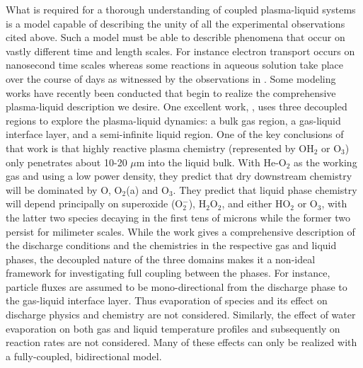 What is required for a thorough understanding of coupled plasma-liquid systems is a model capable of describing the unity of all the experimental observations cited above. Such a model must be able to describle phenomena that occur on vastly different time and length scales. For instance electron transport occurs on nanosecond time scales whereas some reactions in aqueous solution take place over the course of days as witnessed by the observations in \cite{Traylor2011h}. Some modeling works have recently been conducted that begin to realize the comprehensive plasma-liquid description we desire. One excellent work, \cite{Chen2014a}, uses three decoupled regions to explore the plasma-liquid dynamics: a bulk gas region, a gas-liquid interface layer, and a semi-infinite liquid region. One of the key conclusions of that work is that highly reactive plasma chemistry (represented by OH$_2$ or O$_3$) only penetrates about 10-20 $\mu$m into the liquid bulk. With He-O$_2$ as the working gas and using a low power density, they predict that dry downstream chemistry will be dominated by O, O$_2$(a) and O$_3$. They predict that liquid phase chemistry will depend principally on superoxide (O$_2^-$), H$_2$O$_2$, and either HO$_2$ or O$_3$, with the latter two species decaying in the first tens of microns while the former two persist for milimeter scales. While the work gives a comprehensive description of the discharge conditions and the chemistries in the respective gas and liquid phases, the decoupled nature of the three domains makes it a non-ideal framework for investigating full coupling between the phases. For instance, particle fluxes are assumed to be mono-directional from the discharge phase to the gas-liquid interface layer. Thus evaporation of species and its effect on discharge physics and chemistry are not considered. Similarly, the effect of water evaporation on both gas and liquid temperature profiles and subsequently on reaction rates are not considered. Many of these effects can only be realized with a fully-coupled, bidirectional model.

